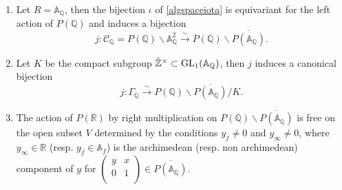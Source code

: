 \documentclass[graybox, envcountsect%
]{svmult}
\def\GL{{\rm GL}}
\def\A{{\mathbb A}}
\def\Q{{\mathbb Q}}
\def\R{{\mathbb R}}
\def\Z{{\mathbb Z}}
\def\hatz{{\hat\Z^\times}}
\def\cC{{\mathcal C}}
\def\gaq{{\Gamma_\Q}}
\def\caq{{\cC_\Q}}
\begin{document}
\begin{lemma}\label{Pdescrofgamma}\
\begin{enumerate}
\item[(i)] Let $R=\A_\Q$, then the bijection $\iota$ of \eqref{algspaceiota} is equivariant for the left action of $P(\Q)$ and induces a bijection
\begin{equation}\label{algspaceP1}
j:\caq=P(\Q)\backslash 	\A_\Q^2\stackrel{\sim}{\to} 	P(\Q)\backslash
\overline{P(\A_\Q)}.
\end{equation}
\item[(ii)] Let $K$ be the  compact subgroup $\hatz\subset \GL_1(\A_\Q)$, then $j$ induces a canonical bijection 
	\begin{equation}\label{algspaceP2}
j:\gaq \stackrel{\sim}{\to} 	P(\Q)\backslash
\overline{P(\A_\Q)}/K.
\end{equation}
\item[(iii)] The action of $P(\R)$  by right multiplication on  $P(\Q)\backslash
\overline{P(\A_\Q)}$ is free on the open subset $V$ determined by the conditions $y_f\neq 0$ and $y_\infty \neq 0$, where $y_\infty\in \R$ (resp. $y_f\in \A_f$) is the archimedean (resp. non archimedean) component of $y$ for $\left(
\begin{array}{cc}
 y & x \\
 0 & 1 \\
\end{array}
\right)\in \overline{P(\A_\Q)}$. 
\end{enumerate}
\end{lemma}
\end{document}
